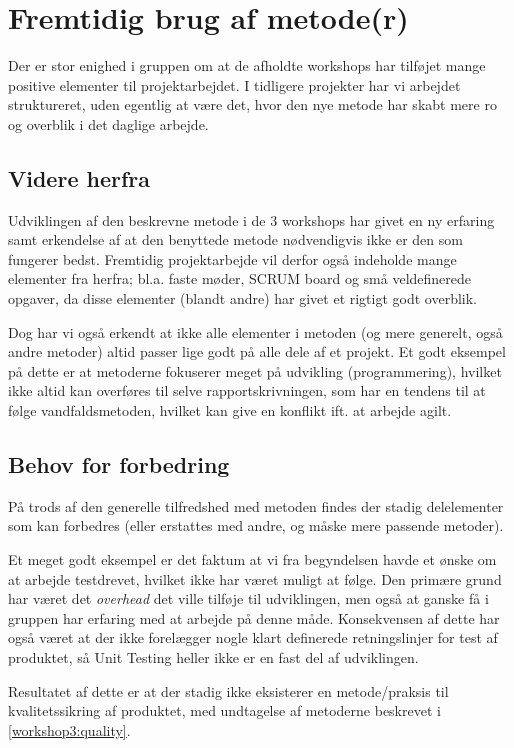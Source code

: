 \section{Fremtidig brug af metode(r)}\label{workshop3:fremtidig_brug}
Der er stor enighed i gruppen om at de afholdte workshops har tilføjet mange positive elementer til projektarbejdet.
I tidligere projekter har vi arbejdet struktureret, uden egentlig at være det, hvor den nye metode har skabt mere ro og overblik i det daglige arbejde.

\subsection{Videre herfra}
Udviklingen af den beskrevne metode i de 3 workshops har givet en ny erfaring samt erkendelse af at den benyttede metode nødvendigvis ikke er den som fungerer bedst.
Fremtidig projektarbejde vil derfor også indeholde mange elementer fra herfra; bl.a. faste møder, SCRUM board og små veldefinerede opgaver, da disse elementer (blandt andre) har givet et rigtigt godt overblik.

Dog har vi også erkendt at ikke alle elementer i metoden (og mere generelt, også andre metoder) altid passer lige godt på alle dele af et projekt.
Et godt eksempel på dette er at metoderne fokuserer meget på udvikling (programmering), hvilket ikke altid kan overføres til selve rapportskrivningen, som har en tendens til at følge vandfaldsmetoden, hvilket kan give en konflikt ift. at arbejde agilt.

\subsection{Behov for forbedring}
På trods af den generelle tilfredshed med metoden findes der stadig delelementer som kan forbedres (eller erstattes med andre, og måske mere passende metoder).

Et meget godt eksempel er det faktum at vi fra begyndelsen havde et ønske om at arbejde testdrevet, hvilket ikke har været muligt at følge.
Den primære grund har været det \textit{overhead} det ville tilføje til udviklingen, men også at ganske få i gruppen har erfaring med at arbejde på denne måde.
Konsekvensen af dette har også været at der ikke forelægger nogle klart definerede retningslinjer for test af produktet, så Unit Testing heller ikke er en fast del af udviklingen.

Resultatet af dette er at der stadig ikke eksisterer en metode/praksis til kvalitetssikring af produktet, med undtagelse af metoderne beskrevet i \cref{workshop3:quality}.